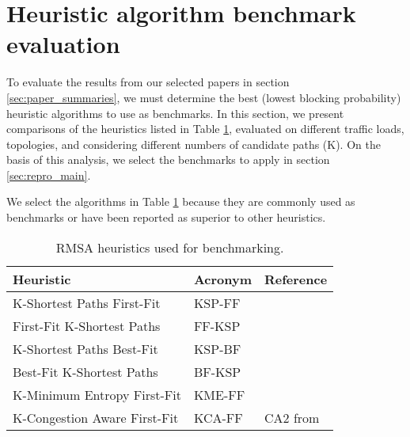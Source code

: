 \section{Heuristic algorithm benchmark evaluation}
\label{sec:heuristic_comparison}

To evaluate the results from our selected papers in section \ref{sec:paper_summaries}, we must determine the best (lowest blocking probability) heuristic algorithms to use as benchmarks. In this section, we present comparisons of the heuristics listed in Table \ref{tab:heuristics}, evaluated on different traffic loads, topologies, and considering different numbers of candidate paths (K). On the basis of this analysis, we select the benchmarks to apply in section \ref{sec:repro_main}.

We select the algorithms in Table \ref{tab:heuristics} because they are commonly used as benchmarks or have been reported as superior to other heuristics.


\begin{table}[h]
\begin{tabular}{l|l|l}
Heuristic                         & Acronym & Reference                \\ \hline
K-Shortest Paths First-Fit        & KSP-FF  & \cite{vincent_scalable_2019} \\
First-Fit K-Shortest Paths        & FF-KSP  & \cite{vincent_scalable_2019} \\
K-Shortest Paths Best-Fit         & KSP-BF  & \cite{abkenar_best_2016} \\
Best-Fit K-Shortest Paths         & BF-KSP  & \cite{abkenar_best_2016} \\
K-Minimum Entropy First-Fit       & KME-FF  & \cite{wright_minimum-_2015} \\
K-Congestion Aware First-Fit      & KCA-FF  & CA2 from \cite{savory_congestion_2014}
\end{tabular}
\caption{RMSA heuristics used for benchmarking.}
\label{tab:heuristics}
\end{table}


